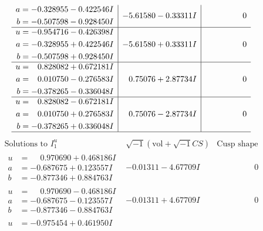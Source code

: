 \documentclass[1p]{elsarticle_modified}
\theoremstyle{definition}
\newcommand{\I}{\sqrt{-1}}
\begin{document}
$$\begin{array}{c|c|c}
\begin{aligned}
a &= -0.328955 - 0.422546 I \\
b &= -0.507598 - 0.928450 I\end{aligned}
 & -5.61580 - 0.33311 I & \phantom{-0.000000 } 0 \\ \hline\begin{aligned}
u &= -0.954716 - 0.426398 I \\
a &= -0.328955 + 0.422546 I \\
b &= -0.507598 + 0.928450 I\end{aligned}
 & -5.61580 + 0.33311 I & \phantom{-0.000000 } 0 \\ \hline\begin{aligned}
u &= \phantom{-}0.828082 + 0.672181 I \\
a &= \phantom{-}0.010750 - 0.276583 I \\
b &= -0.378265 - 0.336048 I\end{aligned}
 & \phantom{-}0.75076 + 2.87734 I & \phantom{-0.000000 } 0 \\ \hline\begin{aligned}
u &= \phantom{-}0.828082 - 0.672181 I \\
a &= \phantom{-}0.010750 + 0.276583 I \\
b &= -0.378265 + 0.336048 I\end{aligned}
 & \phantom{-}0.75076 - 2.87734 I & \phantom{-0.000000 } 0\\
 \hline 
 \end{array}$$\newpage$$\begin{array}{c|c|c}  
\text{Solutions to }I^u_{1}& \I (\text{vol} + \sqrt{-1}CS) & \text{Cusp shape}\\
 \hline 
\begin{aligned}
u &= \phantom{-}0.970690 + 0.468186 I \\
a &= -0.687675 + 0.123557 I \\
b &= -0.877346 + 0.884763 I\end{aligned}
 & -0.01311 - 4.67709 I & \phantom{-0.000000 } 0 \\ \hline\begin{aligned}
u &= \phantom{-}0.970690 - 0.468186 I \\
a &= -0.687675 - 0.123557 I \\
b &= -0.877346 - 0.884763 I\end{aligned}
 & -0.01311 + 4.67709 I & \phantom{-0.000000 } 0 \\ \hline\begin{aligned}
u &= -0.975454 + 0.461950 I \\

\end{aligned}
\end{array}$$
\end{document}

